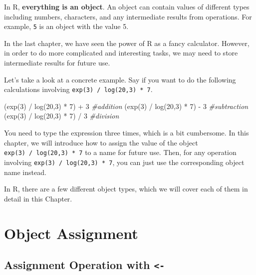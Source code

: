 \documentclass[
]{book}
\newenvironment{Shaded}{\begin{snugshade}}{\end{snugshade}}
\newcommand{\CommentTok}[1]{\textcolor[rgb]{0.56,0.35,0.01}{\textit{#1}}}
\newcommand{\DecValTok}[1]{\textcolor[rgb]{0.00,0.00,0.81}{#1}}
\newcommand{\FunctionTok}[1]{\textcolor[rgb]{0.00,0.00,0.00}{#1}}
\newcommand{\NormalTok}[1]{#1}
\newcommand{\SpecialCharTok}[1]{\textcolor[rgb]{0.00,0.00,0.00}{#1}}
\begin{document}
In R, \textbf{everything is an object}. An object can contain values of different types including numbers, characters, and any intermediate results from operations. For example, \texttt{5} is an object with the value 5.

In the last chapter, we have seen the power of R as a fancy calculator. However, in order to do more complicated and interesting tasks, we may need to store intermediate results for future use.

Let's take a look at a concrete example. Say if you want to do the following calculations involving \texttt{exp(3)\ /\ log(20,3)\ *\ 7}.

\begin{Shaded}
\begin{Highlighting}[]
\NormalTok{(}\FunctionTok{exp}\NormalTok{(}\DecValTok{3}\NormalTok{) }\SpecialCharTok{/} \FunctionTok{log}\NormalTok{(}\DecValTok{20}\NormalTok{,}\DecValTok{3}\NormalTok{) }\SpecialCharTok{*} \DecValTok{7}\NormalTok{) }\SpecialCharTok{+} \DecValTok{3} \CommentTok{\#addition}
\NormalTok{(}\FunctionTok{exp}\NormalTok{(}\DecValTok{3}\NormalTok{) }\SpecialCharTok{/} \FunctionTok{log}\NormalTok{(}\DecValTok{20}\NormalTok{,}\DecValTok{3}\NormalTok{) }\SpecialCharTok{*} \DecValTok{7}\NormalTok{) }\SpecialCharTok{{-}} \DecValTok{3} \CommentTok{\#subtraction}
\NormalTok{(}\FunctionTok{exp}\NormalTok{(}\DecValTok{3}\NormalTok{) }\SpecialCharTok{/} \FunctionTok{log}\NormalTok{(}\DecValTok{20}\NormalTok{,}\DecValTok{3}\NormalTok{) }\SpecialCharTok{*} \DecValTok{7}\NormalTok{) }\SpecialCharTok{/} \DecValTok{3} \CommentTok{\#division}
\end{Highlighting}
\end{Shaded}

You need to type the expression three times, which is a bit cumbersome. In this chapter, we will introduce how to assign the value of the object \texttt{exp(3)\ /\ log(20,3)\ *\ 7} to a name for future use. Then, for any operation involving \texttt{exp(3)\ /\ log(20,3)\ *\ 7}, you can just use the corresponding object name instead.

In R, there are a few different object types, which we will cover each of them in detail in this Chapter.

\hypertarget{Object-Assignment}{%
\section{Object Assignment}\label{Object-Assignment}}

\hypertarget{assignment-operation-with--}{%
\subsection{\texorpdfstring{Assignment Operation with \texttt{\textless{}-}}{Assignment Operation with \textless-}}\label{assignment-operation-with--}}
\end{document}
